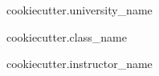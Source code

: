 \doublespacing{}

\vspace*{\fill}

\begin{center}

\textbf{\thetitle}

\vspace{0.5in}

\theauthor{}

{{cookiecutter.university_name}}

{{cookiecutter.class_name}}

{{cookiecutter.instructor_name}}

\thedate{}

\end{center}

\vspace*{\fill}

\pagebreak
